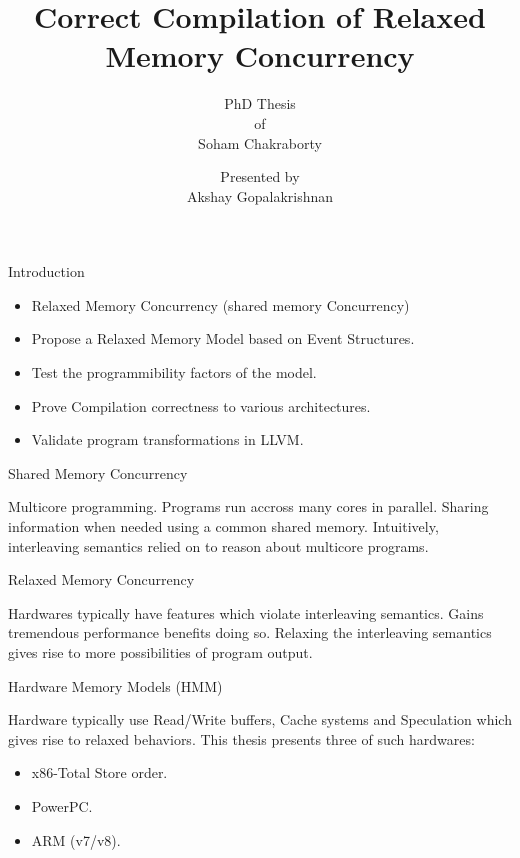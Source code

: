 \documentclass[xcolor={dvipsnames}]{beamer}
\title{Correct Compilation of Relaxed Memory Concurrency}
\subtitle{PhD Thesis \\ of \\ Soham Chakraborty}
\author{Presented by \\ Akshay Gopalakrishnan}
\begin{document}
    
    \begin{frame}
        \maketitle
    \end{frame}

    \begin{frame}{Introduction}

        \begin{itemize}
            \item Relaxed Memory Concurrency (shared memory Concurrency)
            \item Propose a Relaxed Memory Model based on Event Structures.
            \item Test the programmibility factors of the model.
            \item Prove Compilation correctness to various architectures.  
            \item Validate program transformations in LLVM.  
        \end{itemize}
        
    \end{frame}

    \begin{frame}{Shared Memory Concurrency }
        
        Multicore programming.
        Programs run accross many cores in parallel.
        Sharing information when needed using a common shared memory.
        Intuitively, interleaving semantics relied on to reason about multicore programs.

    \end{frame}

    \begin{frame}{Relaxed Memory Concurrency}
        
        Hardwares typically have features which violate interleaving semantics.
        Gains tremendous performance benefits doing so. 
        Relaxing the interleaving semantics gives rise to more possibilities of program output. 

    \end{frame}

    \begin{frame}{Hardware Memory Models (HMM)}
        
        Hardware typically use Read/Write buffers, Cache systems and Speculation which gives rise to relaxed behaviors.
        This thesis presents three of such hardwares:
        \begin{itemize}
            \item x86-Total Store order.
            \item PowerPC.
            \item ARM (v7/v8).
        \end{itemize}

    \end{frame}
\end{document}
